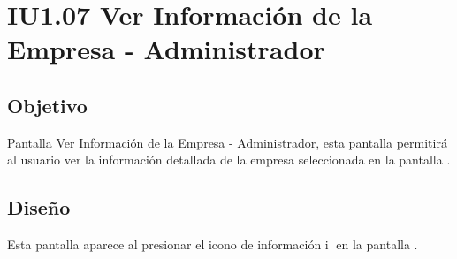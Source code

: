 \newpage
\section{IU1.07 Ver Información de la Empresa - Administrador}

\subsection{Objetivo}
	Pantalla Ver Información de la Empresa - Administrador, esta pantalla permitirá al usuario  ver la información detallada de la empresa seleccionada en la pantalla .
	
	


\subsection{Diseño}
    Esta pantalla aparece al presionar el icono de información \textcircled{i} en la pantalla .

	
